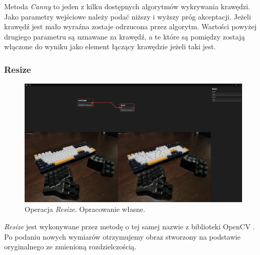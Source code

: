 Metoda \textit{Canny} \cite{canny} to jeden z kilku dostępnych algorytmów wykrywania krawędzi. Jako parametry wejściowe należy podać niższy i wyższy próg akceptacji.
Jeżeli krawędź jest mało wyraźna zostaje odrzucona przez algorytm. 
Wartości powyżej drugiego parametru są uznawane za krawędź, a te które są pomiędzy zostają włączone do wyniku jako element łączący krawędzie jeżeli taki jest. 

\subsubsection{Resize}

\begin{figure}[H]
    \centering
    \includegraphics[width=1\linewidth]{images/Picture26.jpg}
    \caption{Operacja \textit{Resize}. Opracowanie własne.}
    \label{fig:resize}
\end{figure} 

\textit{Resize} jest wykonywane przez metodę o tej samej nazwie z biblioteki OpenCV \cite{resize}. Po podaniu nowych wymiarów otrzymujemy obraz stworzony na podstawie oryginalnego ze zmienioną rozdzielczością.